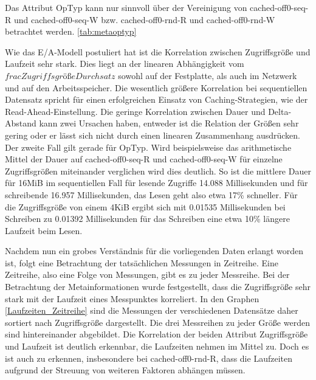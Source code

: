 \documentclass[
	12pt,
	a4paper,
	BCOR10mm,
	DIV14,
	listof=totoc,
	bibliography=totoc,
	headsepline
]{scrreprt}
\begin{document}
Das Attribut OpTyp kann nur sinnvoll über der Vereinigung von cached-off0-seq-R und cached-off0-seq-W bzw. cached-off0-rnd-R und cached-off0-rnd-W betrachtet werden. \ref{tab:metaoptyp}

Wie das E/A-Modell postuliert hat ist die Korrelation zwischen Zugriffsgröße und Laufzeit sehr stark. Dies liegt an der linearen Abhängigkeit vom $frac{Zugriffsgrö\text{ß}e}{Durchsatz}$ sowohl auf der Festplatte, als auch im Netzwerk und auf den Arbeitsspeicher.
Die wesentlich größere Korrelation bei sequentiellen Datensatz spricht für einen erfolgreichen Einsatz von Caching-Strategien, wie der Read-Ahead-Einstellung.
Die geringe Korrelation zwischen Dauer und Delta-Abstand kann zwei Ursachen haben, entweder ist die Relation der Größen sehr gering oder er lässt sich nicht durch einen linearen Zusammenhang ausdrücken. 
Der zweite Fall gilt gerade für OpTyp. Wird beispielsweise das arithmetische Mittel der Dauer auf cached-off0-seq-R und cached-off0-seq-W für einzelne Zugriffsgrößen miteinander verglichen wird dies deutlich.
So ist die mittlere Dauer für 16MiB im sequentiellen Fall für lesende Zugriffe 14.088 Millisekunden und für schreibende 16.957 Millisekunden, das Lesen geht also etwa 17\% schneller.
Für die Zugriffsgröße von einem 4KiB ergibt sich mit 0.01535 Millisekunden bei Schreiben zu 0.01392 Millisekunden für das Schreiben eine etwa 10\% längere Laufzeit beim Lesen.

\begin{table}
	\scriptsize
\end{table}

Nachdem nun ein grobes Verständnis für die vorliegenden Daten erlangt worden ist, folgt eine Betrachtung der tatsächlichen Messungen in Zeitreihe.
Eine Zeitreihe, also eine Folge von Messungen, gibt es zu jeder Messreihe.
Bei der Betrachtung der Metainformationen wurde festgestellt, dass die Zugriffsgröße sehr stark mit der Laufzeit eines Messpunktes korreliert.
In den Graphen \ref{Laufzeiten_Zeitreihe} sind die Messungen der verschiedenen Datensätze daher sortiert nach Zugriffsgröße dargestellt. Die drei Messreihen zu jeder Größe werden sind hintereinander abgebildet.
Die Korrelation der beiden Attribut Zugriffsgröße und Laufzeit ist deutlich erkennbar, die Laufzeiten nehmen im Mittel zu. Doch es ist auch zu erkennen, insbesondere bei cached-off0-rnd-R, dass die Laufzeiten aufgrund der Streuung von weiteren Faktoren abhängen müssen.
\end{document}
